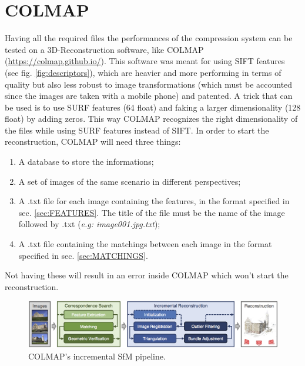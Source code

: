 
\section{COLMAP} \label{sec:COLMAP}
Having all the required files the performances of the compression system can be tested on a 3D-Reconstruction software, like COLMAP (\url{https://colmap.github.io/}). This software was meant for using SIFT features (see fig. \ref{fig:descriptors}), which are heavier and more performing in terms of quality but also less robust to image transformations (which must be accounted since the images are taken with a mobile phone) and patented. A trick that can be used is to use SURF features (64 float) and faking a larger dimensionality (128 float) by adding zeros. This way COLMAP recognizes the right dimensionality of the files while using SURF features instead of SIFT. In order to start the reconstruction, COLMAP will need three things:
\begin{enumerate}
\item A database to store the informations;
\item A set of images of the same scenario in different perspectives;
\item A .txt file for each image containing the features, in the format specified in sec. \ref{sec:FEATURES}. The title of the file must be the name of the image followed by .txt (\emph{e.g: image001.jpg.txt});
\item A .txt file containing the matchings between each image in the format specified in sec. \ref{sec:MATCHINGS}.
\end{enumerate}
Not having these will result in an error inside COLMAP which won't start the reconstruction.


\begin{figure}[h!]
    \centering
    \includegraphics[width=\textwidth]{images/colmap.png}
    \caption{COLMAP’s incremental SfM pipeline.}
    \label{fig:colmap}    
\end{figure}